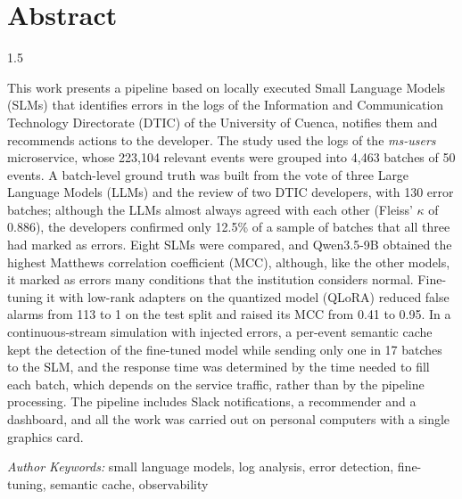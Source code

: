 \chapter*{Abstract}

\begin{spacing}{1.5}

This work presents a pipeline based on locally executed Small Language Models (SLMs) that identifies errors in the logs of the Information and Communication Technology Directorate (DTIC) of the University of Cuenca, notifies them and recommends actions to the developer. The study used the logs of the \textit{ms-users} microservice, whose 223,104 relevant events were grouped into 4,463 batches of 50 events. A batch-level ground truth was built from the vote of three Large Language Models (LLMs) and the review of two DTIC developers, with 130 error batches; although the LLMs almost always agreed with each other (Fleiss' $\kappa$ of 0.886), the developers confirmed only 12.5\% of a sample of batches that all three had marked as errors. Eight SLMs were compared, and Qwen3.5-9B obtained the highest Matthews correlation coefficient (MCC), although, like the other models, it marked as errors many conditions that the institution considers normal. Fine-tuning it with low-rank adapters on the quantized model (QLoRA) reduced false alarms from 113 to 1 on the test split and raised its MCC from 0.41 to 0.95. In a continuous-stream simulation with injected errors, a per-event semantic cache kept the detection of the fine-tuned model while sending only one in 17 batches to the SLM, and the response time was determined by the time needed to fill each batch, which depends on the service traffic, rather than by the pipeline processing. The pipeline includes Slack notifications, a recommender and a dashboard, and all the work was carried out on personal computers with a single graphics card.

\end{spacing}

\hspace{1.27cm}\textit{Author Keywords:} small language models, log analysis, error detection, fine-tuning, semantic cache, observability

\vfill %

